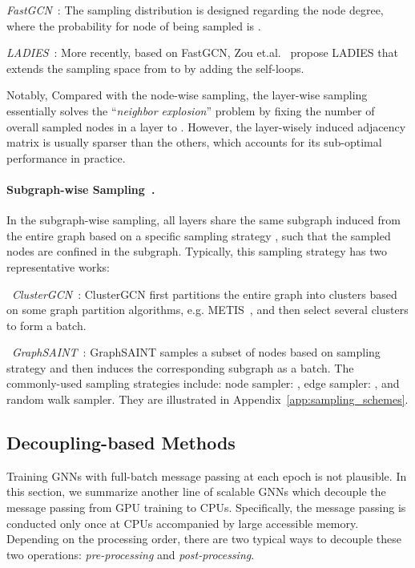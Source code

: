 \message{ !name(main.tex)}\documentclass{article}
\begin{document}
 \textit{FastGCN}~\citep{chen2018fastgcn}: The sampling distribution  is designed regarding the node degree, where the probability for node  of being sampled is .

 \textit{LADIES}~\citep{zou2019layer}: More recently, based on FastGCN, Zou et.al.~\citep{zou2019layer} propose LADIES that extends the sampling space from  to  by adding the self-loops.

Notably, Compared with the node-wise sampling, the layer-wise sampling essentially solves the ``\textit{neighbor explosion}'' problem by fixing the number of overall sampled nodes in a layer to . However, the layer-wisely induced adjacency matrix is usually sparser than the others, which accounts for its sub-optimal performance in practice.

\vspace{-2mm}
\paragraph{Subgraph-wise Sampling~\cite{chiang2019cluster,zeng2019graphsaint}.}\label{sec:subgraph_wise_sampling}
 In the subgraph-wise sampling, all layers share the same subgraph induced from the entire graph  based on a specific sampling strategy , such that the sampled nodes are confined in the subgraph. Typically, this sampling strategy has two representative works:

~\textit{ClusterGCN}~\citep{chiang2019cluster}: ClusterGCN first partitions the entire graph into clusters based on some graph partition algorithms, e.g. METIS~\citep{karypis1998fast}, and then select several clusters to form a batch.

~\textit{GraphSAINT}~\citep{zeng2019graphsaint}: GraphSAINT samples a subset of nodes based on sampling strategy  and then induces the corresponding subgraph as a batch. The commonly-used sampling strategies include:  node sampler: ,  edge sampler: , and  random walk sampler. They are illustrated in Appendix~\ref{app:sampling_schemes}.

\vspace{-2mm}
\subsection{Decoupling-based Methods}\label{sec:formu_decoupling}
\vspace{-2mm}
Training GNNs with full-batch message passing at each epoch is not plausible. In this section, we summarize another line of scalable GNNs which decouple the message passing from GPU training to CPUs. Specifically, the message passing is conducted only once at CPUs accompanied by large accessible memory. Depending on the processing order, there are two typical ways to decouple these two operations:  \textit{pre-processing} and  \textit{post-processing}.
\end{document}
